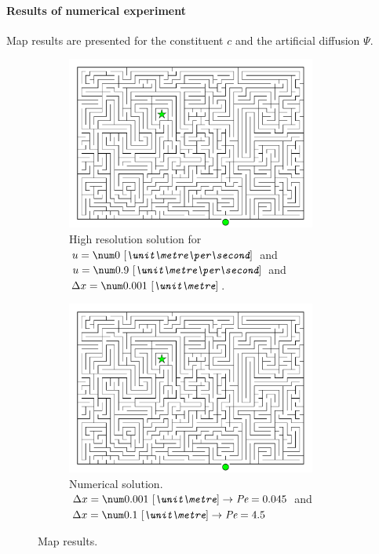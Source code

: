 \paragraph*{Results of numerical experiment}
Map results are presented for the constituent $c$ and the artificial diffusion $\Psi$.
\begin{figure}[H]
    \begin{subfigure}[t]{0.5\textwidth}
        \centering
        \includegraphics[width=0.9\textwidth]{figures/maze.pdf}
        \caption{High resolution solution for $u =\bqty{0}{\metre\per\second}$ and $u = \bqty{0.9}{\metre\per\second}$ and $\Dx=\bqty{0.001}{\metre}$.}
    \end{subfigure}
    \hfill
    \begin{subfigure}[t]{0.5\textwidth}
        \centering
        \includegraphics[width=0.9\textwidth]{figures/maze.pdf}
        \caption{Numerical solution.\newline $\Dx = \bqty{0.001}{\metre} \rightarrow \Pe= 0.045$ and \newline $\Dx = \bqty{0.1}{\metre} \rightarrow \Pe = 4.5$}
    \end{subfigure}
    \caption{Map results.}
\end{figure}
